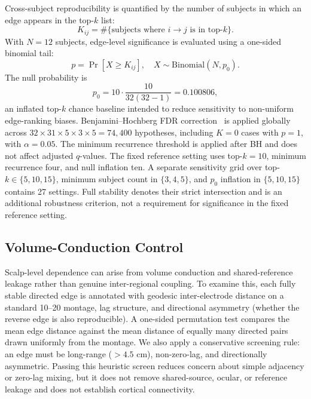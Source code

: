 \documentclass[10pt,journal]{IEEEtran}
\begin{document}
Cross-subject reproducibility is quantified by the number of subjects in which an edge appears in the top-$k$ list:
\begin{equation}
    K_{ij}=\#\{\text{subjects where }i\to j\text{ is in top-}k\}.
\end{equation}
With $N=12$ subjects, edge-level significance is evaluated using a one-sided binomial tail:
\begin{equation}
    p=\Pr[X\ge K_{ij}],\quad X\sim\mathrm{Binomial}(N,p_0).
\end{equation}
The null probability is
\begin{equation}
    p_0 = 10\cdot\frac{10}{32(32-1)}=0.100806,
\end{equation}
an inflated top-$k$ chance baseline intended to reduce sensitivity to non-uniform edge-ranking biases. Benjamini--Hochberg FDR correction~\cite{benjamini1995controlling} is applied globally across $32\times31\times5\times3\times5=74{,}400$ hypotheses, including $K=0$ cases with $p=1$, with $\alpha=0.05$. The minimum recurrence threshold is applied after BH and does not affect adjusted $q$-values. The fixed reference setting uses top-$k=10$, minimum recurrence four, and null inflation ten. A separate sensitivity grid over top-$k\in\{5,10,15\}$, minimum subject count in $\{3,4,5\}$, and $p_0$ inflation in $\{5,10,15\}$ contains 27 settings. Full stability denotes their strict intersection and is an additional robustness criterion, not a requirement for significance in the fixed reference setting.

\subsection{Volume-Conduction Control}
Scalp-level dependence can arise from volume conduction and shared-reference leakage rather than genuine inter-regional coupling. To examine this, each fully stable directed edge is annotated with geodesic inter-electrode distance on a standard 10--20 montage, lag structure, and directional asymmetry (whether the reverse edge is also reproducible). A one-sided permutation test compares the mean edge distance against the mean distance of equally many directed pairs drawn uniformly from the montage. We also apply a conservative screening rule: an edge must be long-range ($>4.5$ cm), non-zero-lag, and directionally asymmetric. Passing this heuristic screen reduces concern about simple adjacency or zero-lag mixing, but it does not remove shared-source, ocular, or reference leakage and does not establish cortical connectivity.
\end{document}
